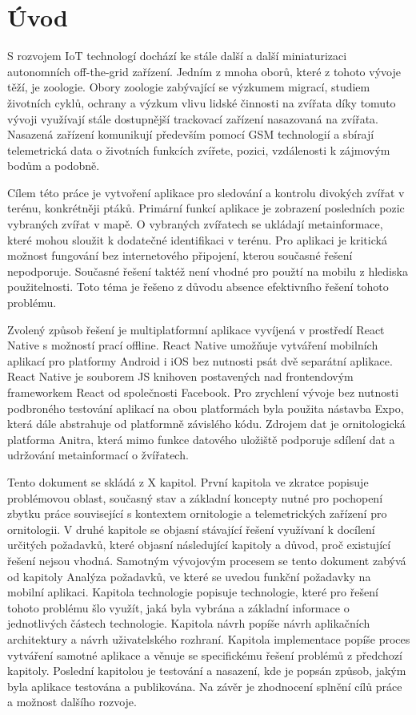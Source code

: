 \chapter*{Úvod}

S rozvojem IoT technologí dochází ke stále další a další miniaturizaci autonomních off-the-grid zařízení. Jedním z mnoha oborů, které z tohoto vývoje těží, je zoologie. Obory zoologie zabývající se výzkumem migrací, studiem životních cyklů, ochrany a výzkum vlivu lidské činnosti na zvířata díky tomuto vývoji využívají stále dostupnější trackovací zařízení nasazovaná na zvířata. Nasazená zařízení komunikují především pomocí GSM technologií a sbírají telemetrická data o životních funkcích zvířete, pozici, vzdálenosti k zájmovým bodům a podobně.

Cílem této práce je vytvoření aplikace pro sledování a kontrolu divokých zvířat v terénu, konkrétněji ptáků. Primární funkcí aplikace je zobrazení posledních pozic vybraných zvířat v mapě. O vybraných zvířatech se ukládají metainformace, které mohou sloužit k dodatečné identifikaci v terénu. Pro aplikaci je kritická možnost fungování bez internetového připojení, kterou současné řešení nepodporuje. Současné řešení taktéž není vhodné pro použtí na mobilu z hlediska použitelnosti. Toto téma je řešeno z důvodu absence efektivního řešení tohoto problému.

Zvolený způsob řešení je multiplatformní aplikace vyvíjená v prostředí React Native s možností prací offline. React Native umožňuje vytváření mobilních aplikací pro platformy Android i iOS bez nutnosti psát dvě separátní aplikace. React Native je souborem JS knihoven postavených nad frontendovým frameworkem React od společnosti Facebook. Pro zrychlení vývoje bez nutnosti podbroného testování aplikací na obou platformách byla použita nástavba Expo, která dále abstrahuje od platformně závislého kódu. Zdrojem dat je ornitologická platforma Anitra, která mimo funkce datového uložiště podporuje sdílení dat a udržování metainformací o žvířatech.

Tento dokument se skládá z X kapitol. První kapitola ve zkratce popisuje problémovou oblast, současný stav a základní koncepty nutné pro pochopení zbytku práce související s kontextem ornitologie a telemetrických zařízení pro ornitologii. V druhé kapitole se objasní stávající řešení využívaní k docílení určitých požadavků, které objasní následující kapitoly a důvod, proč existující řešení nejsou vhodná. Samotným vývojovým procesem se tento dokument zabývá od kapitoly Analýza požadavků, ve které se uvedou funkční požadavky na mobilní aplikaci. Kapitola technologie popisuje technologie, které pro řešení tohoto problému šlo využít, jaká byla vybrána a základní informace o jednotlivých částech technologie. Kapitola návrh popíše návrh aplikačních architektury a návrh uživatelského rozhraní. Kapitola implementace popíše proces vytváření samotné aplikace a věnuje se specifickému řešení problémů z předchozí kapitoly. Poslední kapitolou je testování a nasazení, kde je popsán způsob, jakým byla aplikace testována a publikována. Na závěr je zhodnocení splnění cílů práce a možnost dalšího rozvoje.

